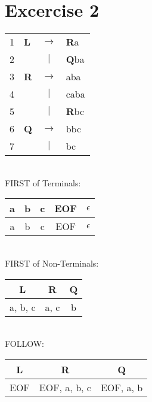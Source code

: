 \documentclass[11pt]{article} %
\begin{document}
\section*{Excercise 2}
\begin{tabular}{llcl}
1
& \textbf{L}
& $\rightarrow$
& \textbf{R}a \\

2
& 
& $\vert$
& \textbf{Q}ba \\

3
& \textbf{R}
& $\rightarrow$
& aba \\

4
& 
& $\vert$
& caba \\

5
& 
& $\vert$
& \textbf{R}bc \\

6
& \textbf{Q}
& $\rightarrow$
& bbc \\

7
& 
& $\vert$
& bc \\
\end{tabular}\\

\noindent FIRST of Terminals: \\

\begin{tabular}{|c|c|c|c|c|} \hline 
\textbf{a}
& \textbf{b}
& \textbf{c}
& \textbf{EOF}
& \textbf{$\epsilon$}\\\hline 

a
& b
& c
& EOF
& $\epsilon$\\\hline  
\end{tabular} \\

\noindent FIRST of Non-Terminals: \\

\begin{tabular}{|c|c|c|} \hline 
\textbf{L}
& \textbf{R}
& \textbf{Q} \\\hline 

a, b, c
& a, c
& b \\\hline  
\end{tabular} \\

\noindent FOLLOW: \\

\begin{tabular}{|c|c|c|} \hline 
\textbf{L}
& \textbf{R}
& \textbf{Q} \\\hline 

EOF
& EOF, a, b, c
& EOF, a, b \\\hline  
\end{tabular} \\
\end{document}
